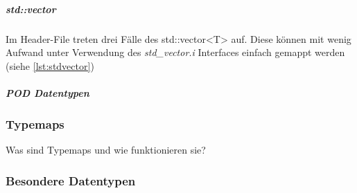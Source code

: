 \begin{code}[caption={std::map},label={lst:stdmap}, escapechar=|]

	


\end{code}

\subparagraph{std::vector}

Im Header-File treten drei Fälle des std::vector<T> auf. Diese können mit wenig Aufwand unter Verwendung des \emph{std\_vector.i} Interfaces einfach gemappt werden (siehe \ref{lst:stdvector})

\begin{code}[caption={std::map},label={lst:stdvector}, escapechar=|]

\end{code}

\subparagraph{POD Datentypen}


\subsubsection{Typemaps}\label{subsubsec:Typemaps}

Was sind Typemaps und wie funktionieren sie?\\

\subsubsection{Besondere Datentypen}\label{subsubsec:Datentypen}

